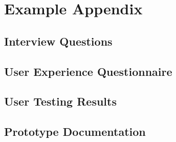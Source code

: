 %
\chapter{Example Appendix}
\label{sec:appendix}

\section{Interview Questions}
\label{sec:appendix:interview-questions}

\section{User Experience Questionnaire}
\label{sec:appendix:questionnaire}

\section{User Testing Results}
\label{sec:appendix:testing-results}

\section{Prototype Documentation}
\label{sec:appendix:prototype-doc}

